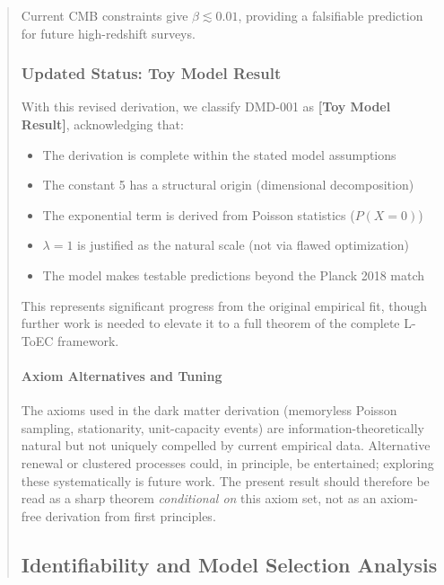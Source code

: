 \documentclass[11pt,titlepage]{article}
\begin{document}
\begin{abstract}
Current CMB constraints give $\beta \lesssim 0.01$, providing a falsifiable prediction for future high-redshift surveys.

\subsubsection{Updated Status: Toy Model Result}
With this revised derivation, we classify DMD-001 as \textbf{[Toy Model Result]}, acknowledging that:
\begin{itemize}
    \item The derivation is complete within the stated model assumptions
    \item The constant 5 has a structural origin (dimensional decomposition)
    \item The exponential term is derived from Poisson statistics ($P(X=0)$)
    \item $\lambda = 1$ is justified as the natural scale (not via flawed optimization)
    \item The model makes testable predictions beyond the Planck 2018 match
\end{itemize}

This represents significant progress from the original empirical fit, though further work is needed to elevate it to a full theorem of the complete L-ToEC framework.

\paragraph{Axiom Alternatives and Tuning}
The axioms used in the dark matter derivation (memoryless Poisson sampling, stationarity, unit-capacity events) are information-theoretically natural but not uniquely compelled by current empirical data. Alternative renewal or clustered processes could, in principle, be entertained; exploring these systematically is future work. The present result should therefore be read as a sharp theorem \emph{conditional on} this axiom set, not as an axiom-free derivation from first principles.\n%

\subsection{Identifiability and Model Selection Analysis}


\end{abstract}
\end{document}
